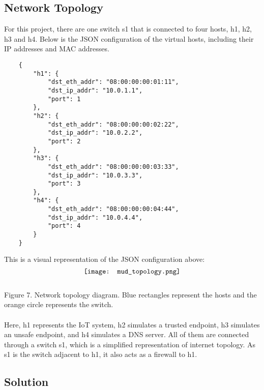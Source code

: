 \subsection{Network Topology}
 For this project, there are one switch s1 that is connected to four hosts, h1, h2, h3 and h4. Below is the JSON configuration of the virtual hosts, including their IP addresses and MAC addresses.
\begin{lstlisting}
    {
        "h1": {
            "dst_eth_addr": "08:00:00:00:01:11",
            "dst_ip_addr": "10.0.1.1",
            "port": 1
        },
        "h2": {
            "dst_eth_addr": "08:00:00:00:02:22",
            "dst_ip_addr": "10.0.2.2",
            "port": 2
        },
        "h3": {
            "dst_eth_addr": "08:00:00:00:03:33",
            "dst_ip_addr": "10.0.3.3",
            "port": 3
        },
        "h4": {
            "dst_eth_addr": "08:00:00:00:04:44",
            "dst_ip_addr": "10.0.4.4",
            "port": 4
        }
    }
\end{lstlisting}
This is a visual representation of the JSON configuration above:
\\
$$\texttt{[image: mud\_topology.png]}\\$$
\\
Figure 7. Network topology diagram. Blue rectangles represent the hosts and the orange circle represents the switch.\\
\\
Here, h1 represents the IoT system, h2 simulates a trusted endpoint, h3 simulates an unsafe endpoint, and h4 simulates a DNS server. All of them are connected through a switch s1, which is a simplified representation of internet topology. As s1 is the switch adjacent to h1, it also acts as a firewall to h1. 

\subsection{Solution}

